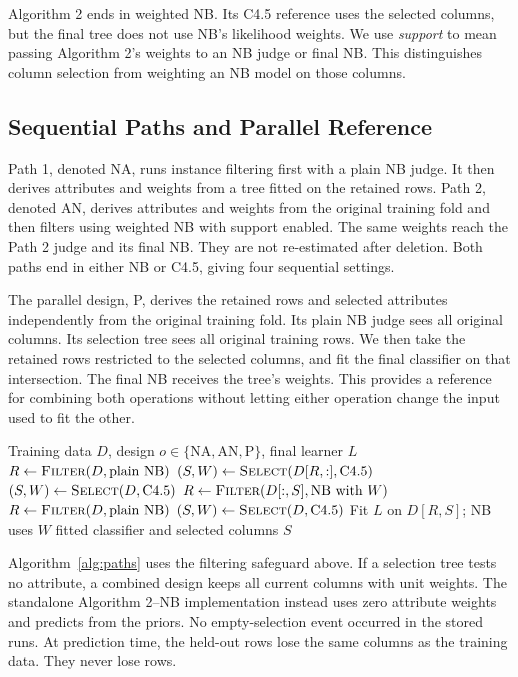 \documentclass[conference,a4paper]{IEEEtran}
\begin{document}
Algorithm 2 ends in weighted NB. Its C4.5 reference uses the selected columns, but the final tree does not use NB's likelihood weights. We use \emph{support} to mean passing Algorithm 2's weights to an NB judge or final NB. This distinguishes column selection from weighting an NB model on those columns.

\subsection{Sequential Paths and Parallel Reference}
Path 1, denoted NA, runs instance filtering first with a plain NB judge. It then derives attributes and weights from a tree fitted on the retained rows. Path 2, denoted AN, derives attributes and weights from the original training fold and then filters using weighted NB with support enabled. The same weights reach the Path 2 judge and its final NB. They are not re-estimated after deletion. Both paths end in either NB or C4.5, giving four sequential settings.

The parallel design, P, derives the retained rows and selected attributes independently from the original training fold. Its plain NB judge sees all original columns. Its selection tree sees all original training rows. We then take the retained rows restricted to the selected columns, and fit the final classifier on that intersection. The final NB receives the tree's weights. This provides a reference for combining both operations without letting either operation change the input used to fit the other.

\setcounter{algorithm}{2}
\begin{algorithm}[t]
\caption{Training a combined method on one fold}
\label{alg:paths}
\begin{algorithmic}[1]
\Require Training data $D$, design $o\in\{\mathrm{NA},\mathrm{AN},\mathrm{P}\}$, final learner $L$
 \State $R\gets\Call{Filter}{D,\text{plain NB}}$
 \State $(S,W)\gets\Call{Select}{D[R,:],\text{C4.5}}$
 \State $(S,W)\gets\Call{Select}{D,\text{C4.5}}$
 \State $R\gets\Call{Filter}{D[:,S],\text{NB with }W}$
\Else
 \State $R\gets\Call{Filter}{D,\text{plain NB}}$
 \State $(S,W)\gets\Call{Select}{D,\text{C4.5}}$
\EndIf
\State Fit $L$ on $D[R,S]$; NB uses $W$
\State \Return fitted classifier and selected columns $S$
\end{algorithmic}
\end{algorithm}

Algorithm~\ref{alg:paths} uses the filtering safeguard above. If a selection tree tests no attribute, a combined design keeps all current columns with unit weights. The standalone Algorithm 2--NB implementation instead uses zero attribute weights and predicts from the priors. No empty-selection event occurred in the stored runs. At prediction time, the held-out rows lose the same columns as the training data. They never lose rows.
\end{document}
